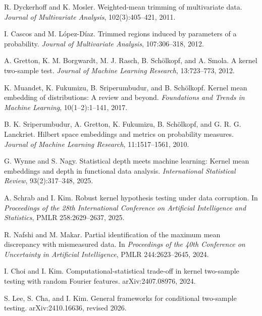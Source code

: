 R. Dyckerhoff and K. Mosler.
\newblock Weighted-mean trimming of multivariate data.
\newblock \emph{Journal of Multivariate Analysis}, 102(3):405--421, 2011.

I. Cascos and M. L\'opez-D\'iaz.
\newblock Trimmed regions induced by parameters of a probability.
\newblock \emph{Journal of Multivariate Analysis}, 107:306--318, 2012.

A. Gretton, K. M. Borgwardt, M. J. Rasch, B. Sch\"olkopf, and A. Smola.
\newblock A kernel two-sample test.
\newblock \emph{Journal of Machine Learning Research}, 13:723--773, 2012.

K. Muandet, K. Fukumizu, B. Sriperumbudur, and B. Sch\"olkopf.
\newblock Kernel mean embedding of distributions: A review and beyond.
\newblock \emph{Foundations and Trends in Machine Learning}, 10(1--2):1--141, 2017.

B. K. Sriperumbudur, A. Gretton, K. Fukumizu, B. Sch\"olkopf, and G. R. G. Lanckriet.
\newblock Hilbert space embeddings and metrics on probability measures.
\newblock \emph{Journal of Machine Learning Research}, 11:1517--1561, 2010.

G. Wynne and S. Nagy.
\newblock Statistical depth meets machine learning: Kernel mean embeddings and depth in functional data analysis.
\newblock \emph{International Statistical Review}, 93(2):317--348, 2025.

A. Schrab and I. Kim.
\newblock Robust kernel hypothesis testing under data corruption.
\newblock In \emph{Proceedings of the 28th International Conference on Artificial Intelligence and Statistics}, PMLR 258:2629--2637, 2025.

R. Nafshi and M. Makar.
\newblock Partial identification of the maximum mean discrepancy with mismeasured data.
\newblock In \emph{Proceedings of the 40th Conference on Uncertainty in Artificial Intelligence}, PMLR 244:2623--2645, 2024.

I. Choi and I. Kim.
\newblock Computational-statistical trade-off in kernel two-sample testing with random Fourier features.
\newblock arXiv:2407.08976, 2024.

S. Lee, S. Cha, and I. Kim.
\newblock General frameworks for conditional two-sample testing.
\newblock arXiv:2410.16636, revised 2026.

